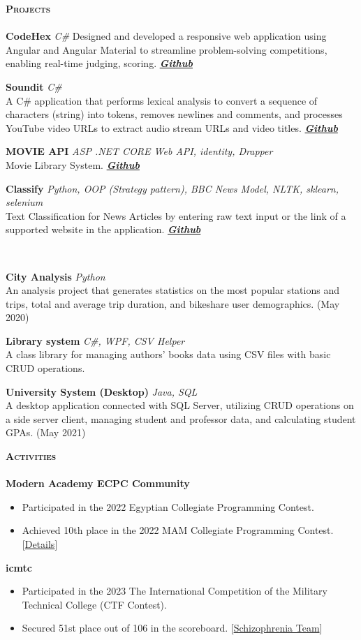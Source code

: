 \documentclass[a4paper]{article}
\newcommand{\lineunder} {
    \vspace*{-8pt} \\
    \hspace*{-18pt} \hrulefill \\
}
\newcommand{\header} [1] {
    {\hspace*{-18pt}\vspace*{6pt} \textsc{\textbf{#1}}}  %
    \vspace*{-6pt} \lineunder
}
\begin{document}
\header{Projects}
\textbf{CodeHex} {\sl C\#}
Designed and developed a responsive web application using Angular and Angular Material to streamline problem-solving competitions, enabling real-time judging, scoring. \href{https://github.com/blackaly/CodeHex}{ \sl \textbf{Github}}

\textbf{Soundit} {\sl C\#}
\\A C\# application that performs lexical analysis to convert a sequence of characters (string) into tokens, removes newlines and comments, and processes YouTube video URLs to extract audio stream URLs and video titles. \href{https://github.com/blackaly/soundit/}{ \sl \textbf{Github}}

\textbf{MOVIE API} {\sl ASP .NET CORE Web API, identity, Drapper}
\\Movie Library System. \href{https://github.com/blackaly/MovieAPI} {\sl \textbf{Github}}

\textbf{Classify} {\sl Python, OOP (Strategy pattern), BBC News Model, NLTK, sklearn, selenium}
\\Text Classification for News Articles by entering raw text input or the link of a supported website in the application. \href{https://github.com/blackaly/classify} {\sl \textbf{Github}}

\

\textbf{City Analysis} {\sl Python}
\\An analysis project that generates statistics on the most popular stations and trips, total and average trip duration, and bikeshare user demographics. (May 2020)

\textbf{Library system} {\sl C\#, WPF, CSV Helper}
\\A class library for managing authors' books data using CSV files with basic CRUD operations.

\textbf{University System (Desktop)} {\sl Java, SQL}
\\A desktop application connected with SQL Server, utilizing CRUD operations on a side server client, managing student and professor data, and calculating student GPAs. (May 2021)



\header{Activities}
\textbf{Modern Academy ECPC Community}
\vspace{-6pt} 
\begin{itemize} \itemsep -2pt
    \item Participated in the 2022 Egyptian Collegiate Programming Contest.
    \item Achieved 10th place in the 2022 MAM Collegiate Programming Contest. [\href{https://icpc.global/ICPCID/6VCK89VLPTH4}{Details}]
\end{itemize}

\textbf{icmtc}
\vspace{-6pt} 
\begin{itemize} \itemsep -2pt
    \item Participated in the 2023 The International Competition of the Military Technical College (CTF Contest).
    \item Secured 51st place out of 106 in the scoreboard. [\href{https://icmtc.egcert.eg/scoreboard}{Schizophrenia Team}]
\end{itemize}
\end{document}
